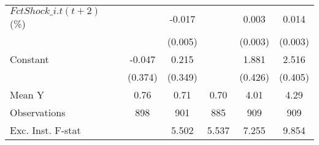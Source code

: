 {\begin{tabular}{l*{5}{c}}
\addlinespace
$ FctShock\_{i.t}(t+2)$ (\%)&                     &      -0.017\sym{***}&                     &       0.003         &       0.014\sym{***}\\
                    &                     &     (0.005)         &                     &     (0.003)         &     (0.003)         \\
\addlinespace
Constant            &      -0.047         &       0.215         &                     &       1.881\sym{***}&       2.516\sym{***}\\
                    &     (0.374)         &     (0.349)         &                     &     (0.426)         &     (0.405)         \\
\midrule
Mean Y              &        0.76         &        0.71         &        0.70         &        4.01         &        4.29         \\
Observations        &         898         &         901         &         885         &         909         &         909         \\
Exc. Inst. F-stat   &                     &       5.502         &       5.537         &       7.255         &       9.854         \\
\bottomrule
\end{tabular}
}
